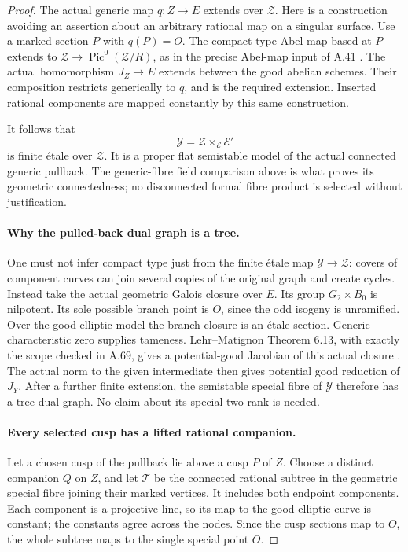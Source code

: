 \begin{proof}
The actual generic map \(q:Z\to E\) extends over
\(\mathcal Z\). Here is a construction avoiding an assertion
about an arbitrary rational map on a singular surface. Use a
marked section \(P\) with \(q(P)=O\). The compact-type
Abel map based at \(P\) extends to
\(\mathcal Z\to\operatorname{Pic}^0(\mathcal Z/R)\), as in
the precise Abel-map input of A.41
\cite[Theorem 1.1 and Proposition 3.2]{fghDupuyRabinoff}.
The actual homomorphism
\(J_Z\to E\) extends between the good abelian schemes.
Their composition restricts generically to \(q\), and is the
required extension. Inserted rational components are mapped
constantly by this same construction.

It follows that
\[
              \mathcal Y=\mathcal Z\times_{\mathcal E}\mathcal E'
\]
is finite \'{e}tale over \(\mathcal Z\). It is a proper flat
semistable model of the actual connected generic pullback.
The generic-fibre field comparison above is what proves its
geometric connectedness; no disconnected formal fibre product
is selected without justification.

\paragraph{Why the pulled-back dual graph is a tree.}
One must not infer compact type just from the finite \'{e}tale
map \(\mathcal Y\to\mathcal Z\): covers of component curves
can join several copies of the original graph and create cycles.
Instead take the actual geometric Galois closure over \(E\).
Its group \(G_2\times B_0\) is nilpotent. Its sole possible
branch point is \(O\), since the odd isogeny is unramified.
Over the good elliptic model the branch closure is an \'{e}tale
section. Generic characteristic zero supplies tameness.
Lehr--Matignon Theorem 6.13, with exactly the scope checked in
A.69, gives a potential-good Jacobian of this actual closure
\cite{fghLehrMatignon2005}.
The actual norm to the given intermediate then gives potential
good reduction of \(J_Y\). After a further finite extension,
the semistable special fibre of \(\mathcal Y\) therefore has a
tree dual graph. No claim about its special two-rank is needed.

\paragraph{Every selected cusp has a lifted rational companion.}
Let a chosen cusp of the pullback lie above a cusp \(P\) of
\(Z\). Choose a distinct companion \(Q\) on \(Z\), and let
\(\mathcal T\) be the connected rational subtree in the
geometric special fibre joining their marked vertices. It
includes both endpoint components. Each component is a
projective line, so its map to the good elliptic curve is
constant; the constants agree across the nodes. Since the
cusp sections map to \(O\), the whole subtree maps to the
single special point \(O\).


\end{proof}
